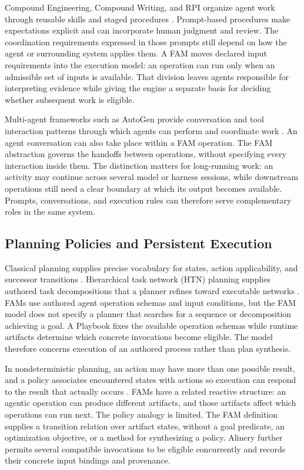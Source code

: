 \documentclass[letterpaper]{article}
\theoremstyle{definition}
\begin{document}
Compound Engineering, Compound Writing, and RPI organize agent work through
reusable skills and staged procedures
\cite{everyCompoundEngineering,everyCompoundWriting,dex2025context}.
Prompt-based procedures make expectations explicit and can incorporate human
judgment and review. The coordination requirements expressed in those prompts
still depend on how the agent or surrounding system applies them. A FAM moves
declared input requirements into the execution model: an operation can run
only when an admissible set of inputs is available. That division leaves
agents responsible for interpreting evidence while giving the engine a
separate basis for deciding whether subsequent work is eligible.

Multi-agent frameworks such as AutoGen provide conversation and tool
interaction patterns through which agents can perform and coordinate work
\cite{wu2024autogen}. An agent conversation can also take place within a FAM
operation. The FAM abstraction governs the handoffs between operations,
without specifying every interaction inside them. The distinction matters
for long-running work: an activity may continue across several model or
harness sessions, while downstream operations still need a clear boundary
at which its output becomes available. Prompts, conversations, and execution
rules can therefore serve complementary roles in the same system.

\subsection{Planning Policies and Persistent Execution}

Classical planning supplies precise vocabulary for states, action
applicability, and successor transitions \cite{fikes1971strips}. Hierarchical
task network (HTN) planning supplies authored task decompositions that a
planner refines toward executable networks \cite{erol1994htn}. FAMs use
authored agent operation schemas and input conditions, but the FAM model does
not specify a planner that searches for a sequence or decomposition achieving
a goal. A Playbook fixes the available operation schemas while runtime
artifacts determine which concrete invocations become eligible. The model
therefore concerns execution of an authored process rather than plan
synthesis.

In nondeterministic planning, an action may have more than one possible
result, and a policy associates encountered states with actions so execution
can respond to the result that actually occurs
\cite{kuter2004nondeterministic}. FAMs have a related reactive structure:
an agentic operation can produce different artifacts, and those artifacts
affect which operations can run next. The policy analogy is limited. The FAM
definition supplies a transition relation over artifact states, without a
goal predicate, an optimization objective, or a method for synthesizing a
policy. Alinery further permits several compatible invocations to be eligible
concurrently and records their concrete input bindings and provenance.
\end{document}
